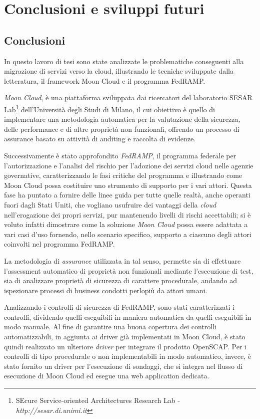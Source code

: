 \documentclass[../main.tex]{subfiles}
\begin{document}
\chapter{Conclusioni e sviluppi futuri}
\section {Conclusioni}
In questo lavoro di tesi sono state analizzate le problematiche conseguenti alla migrazione di servizi verso la cloud, illustrando le tecniche sviluppate dalla letteratura, il framework Moon Cloud e il programma FedRAMP.

\textit{Moon Cloud}, è una piattaforma sviluppata dai ricercatori del laboratorio SESAR Lab\footnote{SEcure Service-oriented Architectures Research Lab - \textit{http://sesar.di.unimi.it}} dell'Università degli Studi di Milano, il cui obiettivo è quello di implementare una metodologia automatica per la valutazione della sicurezza, delle performance e di altre proprietà non funzionali, offrendo un processo di assurance basato su attività di auditing e raccolta di evidenze.

Successivamente è stato approfondito \textit{FedRAMP}, il programma federale per l'autorizzazione e l'analisi del rischio per l'adozione dei servizi cloud nelle agenzie governative, caratterizzando le fasi critiche del programma e illustrando come Moon Cloud possa costituire uno strumento di supporto per i vari attori.
Questa fase ha puntato a fornire delle linee guida per tutte quelle realtà, anche operanti fuori dagli Stati Uniti, che vogliano usufruire dei vantaggi della \textit{cloud} nell'erogazione dei propri servizi, pur mantenendo livelli di rischi accettabili; si è voluto infatti dimostrare come la soluzione \textit{Moon Cloud} possa essere adattata a vari casi d'uso fornendo, nello scenario specifico, supporto a ciascuno degli attori coinvolti nel programma FedRAMP.

La metodologia di \textit{assurance} utilizzata in tal senso, permette sia di effettuare l'assessment automatico di proprietà non funzionali mediante l'esecuzione di test, sia di analizzare proprietà di sicurezza di carattere procedurale, andando ad ispezionare processi di business condotti perlopiù da attori umani.

Analizzando i controlli di sicurezza di FedRAMP, sono stati caratterizzati i controlli, dividendo quelli eseguibili in maniera automatica da quelli eseguibili in modo manuale.
Al fine di garantire una buona copertura dei controlli automatizzabili, in aggiunta ai driver già implementati in Moon Cloud, è stato quindi realizzato un ulteriore \textit{driver} per integrare il prodotto OpenSCAP.
Per i controlli di tipo procedurale o non implementabili in modo automatico, invece, è stato fornito un driver per l'esecuzione di sondaggi, che si integra nel flusso di esecuzione di Moon Cloud ed esegue una web application dedicata.
\end{document}
